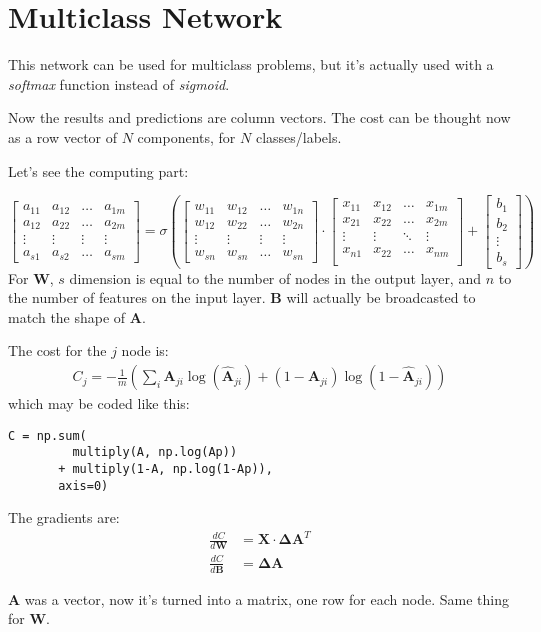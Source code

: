 \section{Multiclass Network}

This network can be used for multiclass problems, but it's actually used with a \textit{softmax} function instead of \textit{sigmoid}. 

Now the results and predictions are column vectors. The cost can be thought now as a row vector of $N$ components, for $N$ classes/labels.

Let's see the computing part:

\begin{equation*}
  \begin{bmatrix}
    a_{11} & a_{12}& \ldots& a_{1m}\\ 
    a_{12} & a_{22}& \ldots& a_{2m}\\ 
    \vdots & \vdots & \vdots& \vdots\\ 
    a_{s1} & a_{s2}& \ldots& a_{sm} 
  \end{bmatrix}
    =\sigma( 
  \begin{bmatrix}
    w_{11} & w_{12}& \ldots& w_{1n}\\ 
    w_{12} & w_{22}& \ldots& w_{2n}\\ 
    \vdots & \vdots & \vdots& \vdots\\ 
    w_{sn} & w_{sn}& \ldots& w_{sn} 
  \end{bmatrix}
  \cdot{}
  \begin{bmatrix}
    x_{11} & x_{12} & \ldots & x_{1m}\\
    x_{21} & x_{22} & \ldots & x_{2m}\\
    \vdots & \vdots & \ddots & \vdots\\
    x_{n1} & x_{22} & \ldots & x_{nm}\\
  \end{bmatrix}
  +
  \begin{bmatrix}
    b_1\\ b_2\\ \vdots\\ b_s
  \end{bmatrix})
\end{equation*}
For $\mathbf{W}$, $s$ dimension is equal to the number of nodes in the output layer, and $n$ to the number of features on the input layer. $\mathbf{B}$ will actually be broadcasted to match the shape of $\mathbf{A}$. 

The cost for the $j$ node is:
\begin{align}
  C_j = -\frac{1}{m}\left(\sum_i \mathbf{A}_{ji}\log(\hat{\mathbf{A}}_{ji}) + (1-\mathbf{A}_{ji})\log(1-\hat{\mathbf{A}}_{ji})\right) 
\end{align}
which may be coded like this:
\begin{verbatim}
C = np.sum(
         multiply(A, np.log(Ap))
       + multiply(1-A, np.log(1-Ap)),
       axis=0)
\end{verbatim}
The gradients are: 
\begin{align}
  \frac{dC}{d\mathbf{W}} &= \mathbf{X}\cdot{}\mathbf{\Delta A}^T\\
  \frac{dC}{d\mathbf{B}} &= \mathbf{\Delta A}
\end{align}

$\mathbf{A}$ was a vector, now it's turned into a matrix, one row for each node. Same thing for $\mathbf{W}$.
